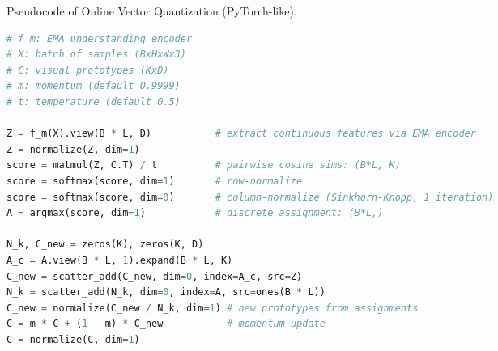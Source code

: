\begin{algorithm}[h]
\caption{Pseudocode of Online Vector Quantization (PyTorch-like).}
\label{alg:online_vq}
\begin{lstlisting}[language=Python]
# f_m: EMA understanding encoder
# X: batch of samples (BxHxWx3)
# C: visual prototypes (KxD)
# m: momentum (default 0.9999)
# t: temperature (default 0.5)

Z = f_m(X).view(B * L, D)           # extract continuous features via EMA encoder
Z = normalize(Z, dim=1)
score = matmul(Z, C.T) / t          # pairwise cosine sims: (B*L, K)
score = softmax(score, dim=1)       # row-normalize
score = softmax(score, dim=0)       # column-normalize (Sinkhorn-Knopp, 1 iteration)
A = argmax(score, dim=1)            # discrete assignment: (B*L,)

N_k, C_new = zeros(K), zeros(K, D)
A_c = A.view(B * L, 1).expand(B * L, K)
C_new = scatter_add(C_new, dim=0, index=A_c, src=Z)
N_k = scatter_add(N_k, dim=0, index=A, src=ones(B * L))
C_new = normalize(C_new / N_k, dim=1) # new prototypes from assignments
C = m * C + (1 - m) * C_new           # momentum update
C = normalize(C, dim=1)
\end{lstlisting}
\end{algorithm}







